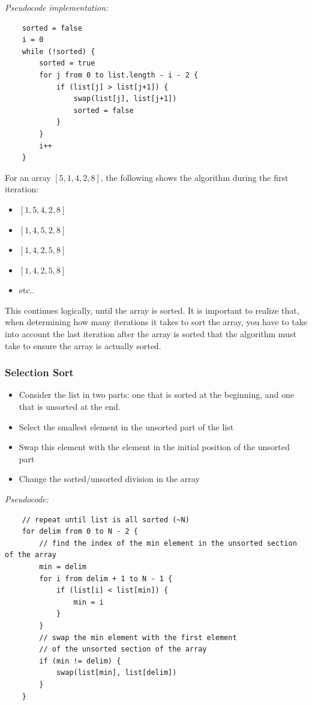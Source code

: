 \documentclass[12pt]{article}
\begin{document}
\textit{Pseudocode implementation:}

\begin{verbatim}
    sorted = false
    i = 0
    while (!sorted) {
        sorted = true
        for j from 0 to list.length - i - 2 {
            if (list[j] > list[j+1]) {
                swap(list[j], list[j+1])
                sorted = false
            }
        }
        i++
    }
\end{verbatim}

For an array $[5,1,4,2,8]$, the following shows the algorithm during the first iteration:

\begin{itemize}
    \item $[1,5,4,2,8]$
    \item $[1,4,5,2,8]$
    \item $[1,4,2,5,8]$
    \item $[1,4,2,5,8]$
    \item etc..
\end{itemize}

This continues logically, until the array is sorted. It is important to realize that, when determining how many iterations it takes to sort the array, you have to take into account the last iteration after the array is sorted that the algorithm must take to ensure the array is actually sorted.

\subsubsection{Selection Sort}
\begin{itemize}
    \item Consider the list in two parts: one that is sorted at the beginning, and one that is unsorted at the end.
    \item Select the smallest element in the unsorted part of the list
    \item Swap this element with the element in the initial position of the unsorted part
    \item Change the sorted/unsorted division in the array
\end{itemize}

\textit{Pseudocode:}

\begin{verbatim}
    // repeat until list is all sorted (~N)
    for delim from 0 to N - 2 {
        // find the index of the min element in the unsorted section of the array
        min = delim
        for i from delim + 1 to N - 1 {
            if (list[i] < list[min]) {
                min = i
            }
        }
        // swap the min element with the first element 
        // of the unsorted section of the array
        if (min != delim) {
            swap(list[min], list[delim])
        }
    }
\end{verbatim}
\end{document}
